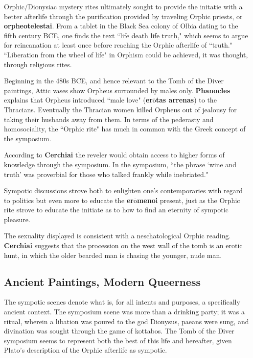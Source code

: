Orphic/Dionysiac mystery rites ultimately sought to provide the initatie with a better afterlife through the purification provided by traveling Orphic priests, or \textbf{orpheotelestai}. From a tablet in the Black Sea colony of Olbia dating to the fifth century BCE, one finds the text ``life death life truth," which seems to argue for reincanation at least once before reaching the Orphic afterlife of ``truth." ``Liberation from the wheel of life" in Orphism could be achieved, it was thought, through religious rites.

Beginning in the 480s BCE, and hence relevant to the Tomb of the Diver paintings, Attic vases show Orpheus surrounded by males only. \textbf{Phanocles} explains that Orpheus introduced ``male love" (\textbf{er$\overline{\text{o}}$tas arrenas}) to the Thracians. Eventually the Thracian women killed Orpheus out of jealousy for taking their husbands away from them. In terms of the pederasty and homosociality, the ``Orphic rite" has much in common with the Greek concept of the symposium.

According to \textbf{Cerchiai} the reveler would obtain access to higher forms of knowledge through the symposium. In the symposium, ``the phrase `wine and truth' was proverbial for those who talked frankly while inebriated."

\begin{nte}
    Sympotic discussions strove both to enlighten one's contemporaries with regard to politics but even more to educate the \textbf{er$\overline{\text{o}}$menoi} present, just as the Orphic rite strove to educate the initiate as to how to find an eternity of sympotic pleasure.
\end{nte}

The sexuality displayed is consistent with a neschatological Orphic reading. \textbf{Cerchiai} suggests that the procession on the west wall of the tomb is an erotic hunt, in which the older bearded man is chasing the younger, nude man.


\subsection{Ancient Paintings, Modern Queerness}

The sympotic scenes denote what is, for all intents and purposes, a specifically ancient context. The symposium scene was more than a drinking party; it was a ritual, wherein a libation was poured to the god Dionysus, paeans were sung, and divination was sought through the game of kottabos. The Tomb of the Diver symposium seems to represent both the best of this life and hereafter, given Plato's description of the Orphic afterlife as sympotic. 

